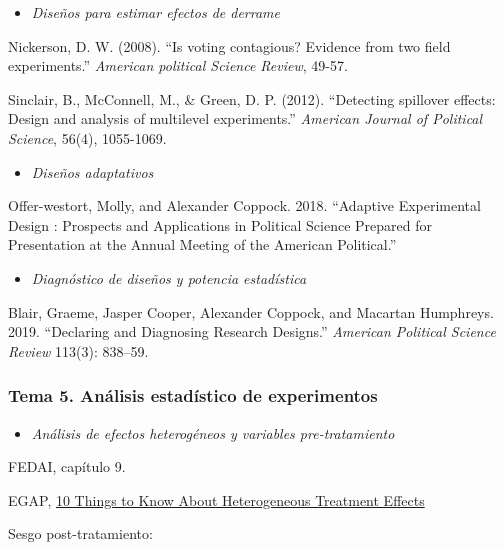 \documentclass[
  12pt,
]{article}
\providecommand{\tightlist}{%
  \setlength{\itemsep}{0pt}\setlength{\parskip}{0pt}}
\begin{document}
\begin{itemize}
\tightlist
\item
  \emph{Diseños para estimar efectos de derrame}
\end{itemize}

Nickerson, D. W. (2008). ``Is voting contagious? Evidence from two field
experiments.'' \emph{American political Science Review}, 49-57.

Sinclair, B., McConnell, M., \& Green, D. P. (2012). ``Detecting
spillover effects: Design and analysis of multilevel experiments.''
\emph{American Journal of Political Science}, 56(4), 1055-1069.

\begin{itemize}
\tightlist
\item
  \emph{Diseños adaptativos}
\end{itemize}

Offer-westort, Molly, and Alexander Coppock. 2018. ``Adaptive
Experimental Design : Prospects and Applications in Political Science
Prepared for Presentation at the Annual Meeting of the American
Political.''

\begin{itemize}
\tightlist
\item
  \emph{Diagnóstico de diseños y potencia estadística}
\end{itemize}

Blair, Graeme, Jasper Cooper, Alexander Coppock, and Macartan Humphreys.
2019. ``Declaring and Diagnosing Research Designs.'' \emph{American
Political Science Review} 113(3): 838--59.

\hypertarget{tema-5.-anuxe1lisis-estaduxedstico-de-experimentos-1}{%
\subsubsection{Tema 5. Análisis estadístico de
experimentos}\label{tema-5.-anuxe1lisis-estaduxedstico-de-experimentos-1}}

\begin{itemize}
\tightlist
\item
  \emph{Análisis de efectos heterogéneos y variables pre-tratamiento}
\end{itemize}

FEDAI, capítulo 9.

EGAP,
\href{https://egap.org/resource/10-things-to-know-about-heterogeneous-treatment-effects/}{10
Things to Know About Heterogeneous Treatment Effects}

Sesgo post-tratamiento:
\end{document}
